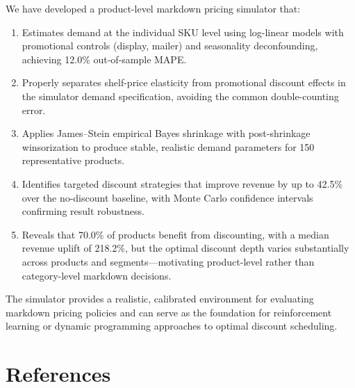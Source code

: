\documentclass[12pt,a4paper]{article}
\begin{document}
We have developed a product-level markdown pricing simulator that:

\begin{enumerate}[nosep]
\item Estimates demand at the individual SKU level using log-linear
models with promotional controls (display, mailer) and seasonality
deconfounding, achieving 12.0\% out-of-sample MAPE.

\item Properly separates shelf-price elasticity from promotional
discount effects in the simulator demand specification, avoiding
the common double-counting error.

\item Applies James--Stein empirical Bayes shrinkage with
post-shrinkage winsorization to produce stable, realistic demand
parameters for 150 representative products.

\item Identifies targeted discount strategies that improve revenue by
up to 42.5\% over the no-discount baseline, with Monte Carlo
confidence intervals confirming result robustness.

\item Reveals that 70.0\% of products benefit from discounting, with
a median revenue uplift of 218.2\%, but the optimal discount depth
varies substantially across products and segments---motivating
product-level rather than category-level markdown decisions.
\end{enumerate}

The simulator provides a realistic, calibrated environment for
evaluating markdown pricing policies and can serve as the foundation
for reinforcement learning or dynamic programming approaches to
optimal discount scheduling.

\section*{References}
\end{document}
